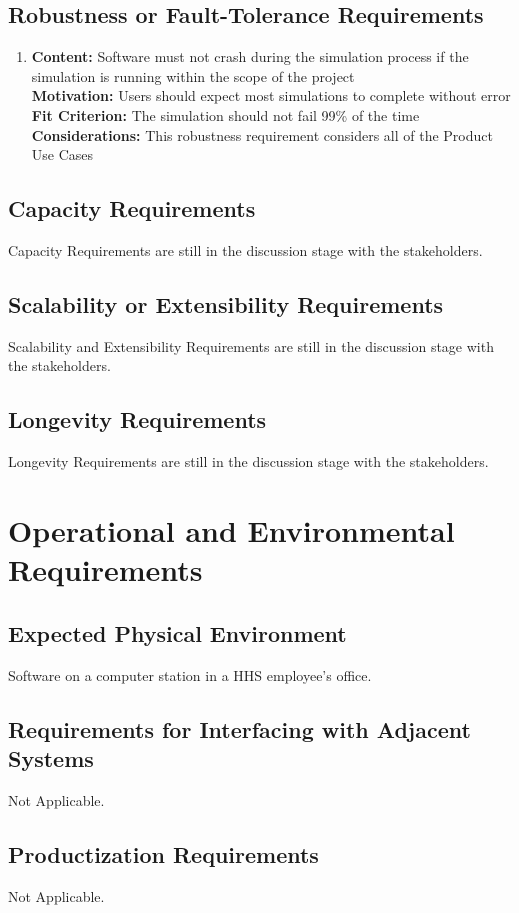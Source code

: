\documentclass[paper=letter, fontsize=10pt]{scrartcl}
\numberwithin{equation}{section}		%
\numberwithin{figure}{section}			%
\numberwithin{table}{section}				%
\begin{document}
\subsection{Robustness or Fault-Tolerance Requirements}
	\begin{enumerate}
		\item \textbf{Content:} Software must not crash during the simulation process if the simulation is running within the scope of the project
		\\	  \textbf{Motivation:} Users should expect most simulations to complete without error
		\\	  \textbf{Fit Criterion:} The simulation should not fail 99\% of the time
		\\	  \textbf{Considerations:} This robustness requirement considers all of the Product Use Cases
	\end{enumerate}
\subsection{Capacity Requirements}
Capacity Requirements are still in the discussion stage with the stakeholders.
\subsection{Scalability or Extensibility Requirements}
Scalability and Extensibility Requirements are still in the discussion stage with the stakeholders.
\subsection{Longevity Requirements}
Longevity Requirements are still in the discussion stage with the stakeholders.

\section{Operational and Environmental Requirements}
\subsection{Expected Physical Environment}
Software on a computer station in a HHS employee's office.
\subsection{Requirements for Interfacing with Adjacent Systems}
Not Applicable.
\subsection{Productization Requirements}
Not Applicable.
\end{document}
